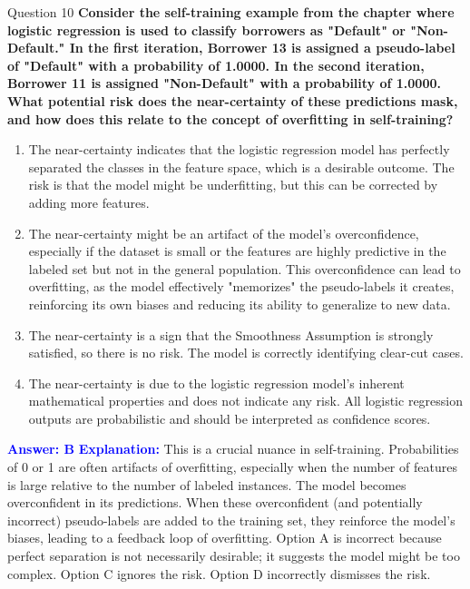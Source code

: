 \documentclass{beamer}
\begin{document}
	\begin{frame}{Question 10}
		\textbf{Consider the self-training example from the chapter where logistic regression is used to classify borrowers as "Default" or "Non-Default." In the first iteration, Borrower 13 is assigned a pseudo-label of "Default" with a probability of 1.0000. In the second iteration, Borrower 11 is assigned "Non-Default" with a probability of 1.0000. What potential risk does the near-certainty of these predictions mask, and how does this relate to the concept of overfitting in self-training?}
		\begin{enumerate}
			\item The near-certainty indicates that the logistic regression model has perfectly separated the classes in the feature space, which is a desirable outcome. The risk is that the model might be underfitting, but this can be corrected by adding more features.
			\item The near-certainty might be an artifact of the model's overconfidence, especially if the dataset is small or the features are highly predictive in the labeled set but not in the general population. This overconfidence can lead to overfitting, as the model effectively "memorizes" the pseudo-labels it creates, reinforcing its own biases and reducing its ability to generalize to new data.
			\item The near-certainty is a sign that the Smoothness Assumption is strongly satisfied, so there is no risk. The model is correctly identifying clear-cut cases.
			\item The near-certainty is due to the logistic regression model's inherent mathematical properties and does not indicate any risk. All logistic regression outputs are probabilistic and should be interpreted as confidence scores.
		\end{enumerate}
		\vspace{0.2cm}
		\textcolor{blue}{\textbf{Answer: B}}
		\vspace{0.2cm}
		\textcolor{blue}{\textbf{Explanation:}} This is a crucial nuance in self-training. Probabilities of 0 or 1 are often artifacts of overfitting, especially when the number of features is large relative to the number of labeled instances. The model becomes overconfident in its predictions. When these overconfident (and potentially incorrect) pseudo-labels are added to the training set, they reinforce the model's biases, leading to a feedback loop of overfitting. Option A is incorrect because perfect separation is not necessarily desirable; it suggests the model might be too complex. Option C ignores the risk. Option D incorrectly dismisses the risk.
	\end{frame}
	
\end{document}
